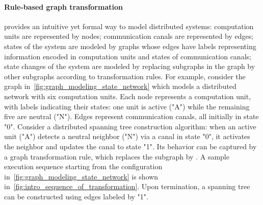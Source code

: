  \paragraph{Rule-based graph transformation} provides an intuitive yet formal way to model distributed systems: computation units are represented by nodes; communication canals are represented by edges; states of the system are modeled by graphs whose edges have labels representing information encoded in computation units and states of communication canals; state changes of the system are modeled by replacing subgraphs in the graph by other subgraphs according to transformation rules. For example, consider the graph in~\autoref{fig:graph_modeling_state_network} which models a distributed network with six computation units. Each node represents a computation unit, with labels indicating their states: one unit is active ("A") while the remaining five are neutral ("N"). Edges represent communication canals, all initially in state "0". Consider a distributed spanning tree construction algorithm: when an active unit ("A") detects a neutral neighbor ("N") via a canal in state "0", it activates the neighbor and updates the canal to state "1". Its behavior can be captured by a graph transformation rule, which replaces the subgraph  by . 
A sample execution sequence starting from the configuration in~\autoref{fig:graph_modeling_state_network} is shown in~\autoref{fig:intro_sequence_of_transformation}. Upon termination, a spanning tree can be constructed using edges labeled by "1".
